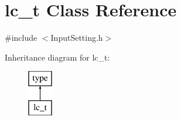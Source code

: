 \hypertarget{classlc__t}{\section{lc\-\_\-t Class Reference}
\label{classlc__t}
}


{\ttfamily \#include $<$Input\-Setting.\-h$>$}

Inheritance diagram for lc\-\_\-t\-:\begin{figure}[H]
\begin{center}
\leavevmode
\includegraphics[height=2.000000cm]{classlc__t}
\end{center}
\end{figure}

